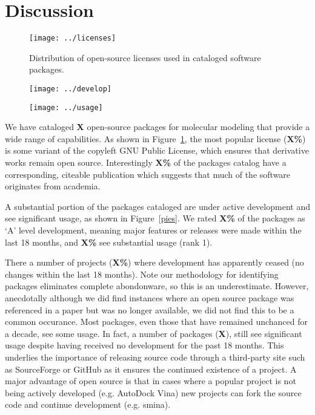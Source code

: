 \section{Discussion}

\begin{figure}
\centering 
\texttt{[image: ../licenses]}
\caption{\label{licenses} Distribution of open-source licenses used in cataloged software packages.}
\end{figure}

\begin{figure*}
\centering
\begin{subfigure}[t]{.4\linewidth}
\centering \label{develop}
\texttt{[image: ../develop]}
\end{subfigure}
\hfill
\begin{subfigure}[t]{.4\linewidth}
\centering \label{usage}
\texttt{[image: ../usage]}
\end{subfigure}
\caption{\label{pies} Activity distributions of cataloged software packages.
 Distribution of development activity.  Distribution of user activity.
}
\end{figure*}

We have cataloged \textbf{X} open-source packages for molecular modeling that provide a wide range of capabilities.  As shown in Figure~\ref{licenses}, the most popular license (\textbf{X\%}) is some variant of the copyleft GNU Public License, which ensures that derivative works remain open source.  Interestingly \textbf{X\%} of the packages catalog have a corresponding, citeable publication which suggests that much of the software originates from academia.   

A substantial portion of the packages cataloged are under active development and see significant usage, as shown in Figure~\ref{pies}.  We rated \textbf{X\%} of the packages as `A' level development, meaning major features or releases were made within the last 18 months, and \textbf{X\%} see substantial usage (rank 1).  

There a number of projects (\textbf{X\%}) where development has apparently ceased (no changes within the last 18 months). Note our methodology for identifying packages eliminates complete abondonware, so this is an underestimate.  However, anecdotally although we did find instances where an open source package was referenced in a paper but was no longer available, we did not find this to be a common occurance.  Most packages, even those that have remained unchanced for a decade, see some usage.  In fact, a number of packages (\textbf{X}), still see significant usage despite having received no development for the past 18 months.  This underlies the importance of releasing source code through a third-party site such as SourceForge or GitHub as it ensures the continued existence of a project.  A major advantage of open source is that in cases where a popular project is not being actively developed (e.g. AutoDock Vina) new projects can fork the source code and continue development (e.g. smina).
